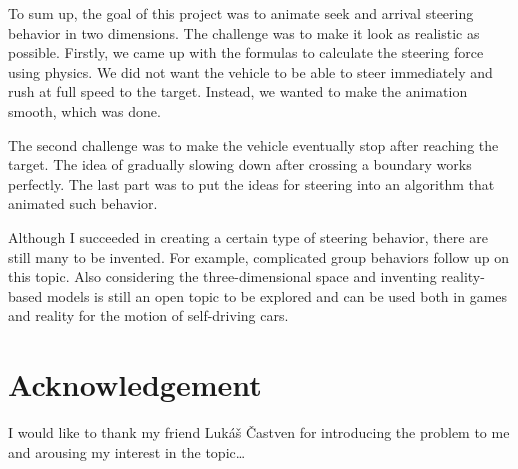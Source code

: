 \documentclass[10pt,twoside,english,a4paper]{article}
\begin{document}
To sum up, the goal of this project was to animate seek and arrival 
steering behavior in two dimensions. The challenge was to 
make it look as realistic as possible. Firstly, we came 
up with the formulas to calculate the steering force using 
physics. We did not want the vehicle to be able to 
steer immediately and rush at full speed to the target. Instead, 
we wanted to make the animation smooth, which was done. 

The second challenge was to make the vehicle eventually stop after 
reaching the target. The idea of gradually slowing down after 
crossing a boundary works perfectly. The last part was to put the ideas
for steering into an algorithm that animated such behavior. 

Although I succeeded in creating a certain type of steering behavior,
there are still many to be invented. For example, complicated group behaviors
follow up on this topic. Also considering the three-dimensional space
and inventing reality-based models is still an open topic to be explored
and can be used both in games and reality for the motion of 
self-driving cars.



\section*{Acknowledgement}
I would like to thank my friend Lukáš Častven for introducing 
the problem to me and arousing my interest in the topic\ldots

 
  
\end{document}
